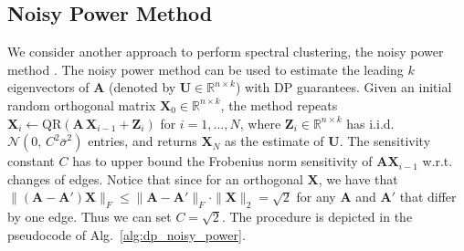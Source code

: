 \documentclass[11pt]{article}
\theoremstyle{plain}
\theoremstyle{definition}
\theoremstyle{remark}
\begin{document}
\subsection{Noisy Power Method}


We consider another approach to perform spectral clustering, the noisy power method \citep{hardt2014noisy}.
The noisy power method can be used to estimate the leading $k$ eigenvectors of $\mathbf{A}$ (denoted by $\mathbf{U} \in \mathbb{R}^{n \times k}$) with DP guarantees. Given an initial random orthogonal matrix $\mathbf{X}_0 \in \mathbb{R}^{n \times k}$, the method repeats $\mathbf{X}_i \leftarrow \mathrm{QR}(\mathbf{A}\,\mathbf{X}_{i-1} + \mathbf{Z}_i)$ for $i=1,\dots,N$, where $\mathbf{Z}_i \in \mathbb{R}^{n\times k}$ has i.i.d.\ $\mathcal{N}(0,\,C^2\bar{\sigma}^2)$ entries, and returns $\mathbf{X}_N$ as the estimate of $\mathbf{U}$.
The sensitivity constant $C$ has to upper bound the Frobenius norm sensitivity of $\mathbf{A}\mathbf{X}_{i-1}$ w.r.t. changes of edges. Notice that since for an orthogonal $\mathbf{X}$, we have that $\|(\mathbf{A}-\mathbf{A}')\mathbf{X}\|_F \leq \|\mathbf{A}-\mathbf{A}'\|_F \cdot \|\mathbf{X}\|_2 = \sqrt{2}$ for any $\mathbf{A}$ and $\mathbf{A}'$ that differ by one edge. Thus we can set $C=\sqrt{2}$. 
The procedure is depicted in the pseudocode of Alg.~\ref{alg:dp_noisy_power}.
\end{document}
